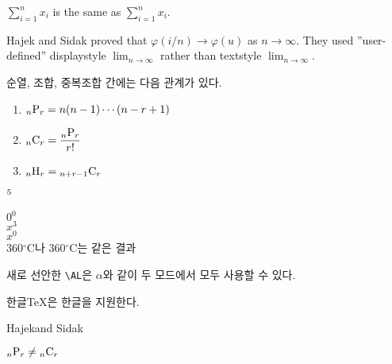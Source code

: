 \documentclass[11pt]{article}
\newcommand{\dsum}[2]{\displaystyle \sum_{#1}^{#2}}
\newcommand{\vphi}{\varphi}
\newcommand{\go}{\longrightarrow}
\newcommand{\Hajek}{Hajek}
\newcommand{\Sidak}{Sidak}
\newcommand{\dlim}[1]{{\displaystyle \lim_{#1}}}
\newcommand{\harcombi}[2]{{}_{#1}{\rm H}_{#2}}
\newcommand{\permut}[2]{{}_{#1}{\rm P}_{#2}}
\newcommand{\combi}[2]{{}_{#1}{\rm C}_{#2}}
\newcommand{\tmp}[1][0]{$\mathrm{R}^{#1}$}
\renewcommand{\tmp}[2][0]{$#2^#1$}
\providecommand{\mdegree}[1]{#1\ensuremath{^\circ}}
\newcommand{\AL}{\ensuremath{\alpha}}
\newcommand{\htex}{\mbox{한글\TeX}}
\newcommand{\HandS}{\Hajek and \Sidak}
\newcommand{\pandc}[2]{\permut{#1}{#2} \ne \combi{#1}{#2}}
\begin{document}
$\dsum{i=1}{n} x_i$ is the same as $\sum_{i=1}^n x_i$.

Hajek and Sidak proved that $\vphi (i/n)\go \vphi(u)$ as $n\go\infty$. They used  ''user-defined'' displaystyle $\dlim{n\go\infty}$ rather than textstyle $\lim_{n\go\infty}$.

순열, 조합, 중복조합 간에는 다음 관계가 있다.
\begin{enumerate}
\item $\permut{n}{r}=n(n-1)\cdots(n-r+1)$
\item $\combi{n}{r}={\displaystyle \frac{\permut{n}{r}}{r!}}$
\item $\harcombi{n}{r}=\combi{n+r-1}{r}$
\end{enumerate}

\tmp[5] \\

\tmp{0} \\

\tmp[3]{x} \\

\tmp{x}  \\

\mdegree{360}C나 $\mdegree{360}$C는 같은 결과

새로 선안한 \verb+\AL+은  $\AL$와 같이 두 모드에서 모두 사용할 수 있다.

\htex 은 한글을 지원한다.

\HandS

$\pandc{n}{r}$
\end{document}
